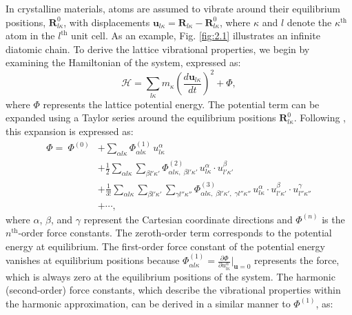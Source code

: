 In crystalline materials, atoms are assumed to vibrate around their equilibrium positions, $\mathbf{R}^0_{l\kappa}$, with displacements $\mathbf{u}_{l\kappa} = \mathbf{R}_{l\kappa}-\mathbf{R}^0_{l\kappa}$, where $\kappa$ and $l$ denote the $\kappa^{\text{th}}$ atom in the $l^{\text{th}}$ unit cell.
As an example, Fig. \ref{fig:2.1} illustrates an infinite diatomic chain.
To derive the lattice vibrational properties, we begin by examining the Hamiltonian of the system, expressed as:
\begin{equation}
\label{equ:2.1}
         \mathcal{H} = \sum_{l\kappa}m_{\kappa}\left(\frac{d{\mathbf{u}}_{l\kappa}}{dt}\right)^{2} + \Phi,       
\end{equation}
where $\Phi$ represents the lattice potential energy. The potential term can be expanded using a Taylor series around the equilibrium positions $\mathbf{R}^0_{l\kappa}$.
Following \cite{Togo2015, Togo2015-qf, Phonopy_toolkit, phonopy}, this expansion is expressed as:
\begin{equation}
\label{equ:2.2}
\begin{split}
        \Phi =\: \Phi^{(0)} &+ \sum_{\alpha l\kappa} \Phi^{(1)}_{\alpha l\kappa} \, u^{\alpha}_{l\kappa} \\
            & + \frac{1}{2} \sum_{\alpha l \kappa} \sum_{\beta l' \kappa'} \Phi^{(2)}_{\alpha l\kappa,\;\beta l'\kappa'} \, u^{\alpha}_{l\kappa} \cdot u^{\beta}_{l'\kappa'} \\
            & + \frac{1}{3!} \sum_{\alpha l \kappa} \sum_{\beta l' \kappa'} \sum_{\gamma l''\kappa''} \Phi^{(3)}_{\alpha l\kappa,\;\beta l'\kappa',\;\gamma l''\kappa''} \, u^{\alpha}_{l\kappa} \cdot u^{\beta}_{l'\kappa'} \cdot u^{\gamma}_{l''\kappa''} \\
            &+ \cdots,
\end{split}
\end{equation}
where $\alpha$, $\beta$, and $\gamma$ represent the Cartesian coordinate directions and $\Phi^{(n)}$ is the $n^{\text{th}}$-order force constants.
The zeroth-order term corresponds to the potential energy at equilibrium.
The first-order force constant of the potential energy vanishes at equilibrium positions because $\Phi^{(1)}_{\alpha l\kappa} = \frac{\partial \Phi}{\partial u^{\alpha}_{l \kappa}}\bigg|_{\mathbf{u}=0}$ represents the force, which is always zero at the equilibrium positions of the system.
The harmonic (second-order) force constants, which describe the vibrational properties within the harmonic approximation, can be derived in a similar manner to  $\Phi^{(1)}$, as: 
